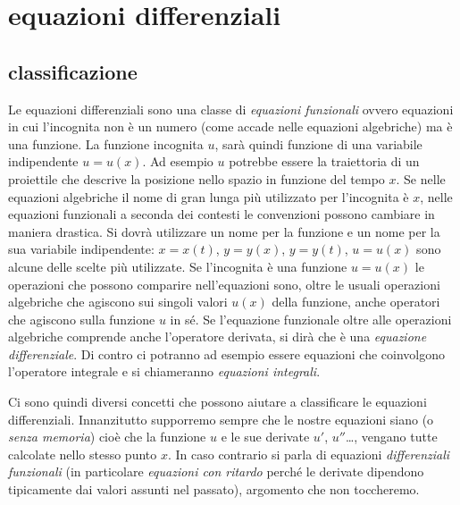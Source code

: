 \chapter{equazioni differenziali}
\label{ch:edo}

\section{classificazione}

Le equazioni differenziali sono una classe di \emph{equazioni funzionali}
ovvero
equazioni in cui l'incognita non è un numero (come accade nelle equazioni algebriche) ma è una funzione. La funzione incognita $u$, sarà quindi funzione di una variabile indipendente $u=u(x)$.
Ad esempio $u$ potrebbe essere la traiettoria di un proiettile che descrive la posizione nello spazio in funzione del tempo $x$. Se nelle equazioni algebriche il nome di gran lunga più utilizzato per l'incognita è $x$, nelle equazioni funzionali a seconda dei contesti le convenzioni possono cambiare in maniera drastica. Si dovrà utilizzare un nome per la funzione e un nome per la sua variabile indipendente: $x=x(t)$, $y=y(x)$, $y=y(t)$, $u=u(x)$ sono alcune delle scelte più utilizzate.
Se l'incognita è una funzione $u=u(x)$ le operazioni che possono comparire nell'equazioni sono,
oltre le usuali operazioni algebriche che agiscono sui singoli valori $u(x)$ della funzione,
anche operatori che agiscono sulla funzione $u$ in sé.
Se l'equazione funzionale oltre alle operazioni algebriche comprende anche
l'operatore derivata, si dirà che è una %
%
\emph{equazione differenziale}.
Di contro ci potranno ad esempio essere equazioni che coinvolgono l'operatore integrale e si chiameranno
\emph{equazioni integrali}.

Ci sono quindi diversi concetti che possono aiutare a classificare le equazioni differenziali.
Innanzitutto supporremo sempre che le nostre equazioni siano 
(o \emph{senza memoria})
cioè che la funzione $u$ e le sue derivate $u'$, $u''$\dots,
vengano tutte calcolate nello stesso punto $x$.
In caso contrario si parla di
equazioni \emph{differenziali funzionali} (in particolare \emph{equazioni con ritardo}
perché le derivate dipendono tipicamente dai valori assunti nel passato),
argomento che non toccheremo.


